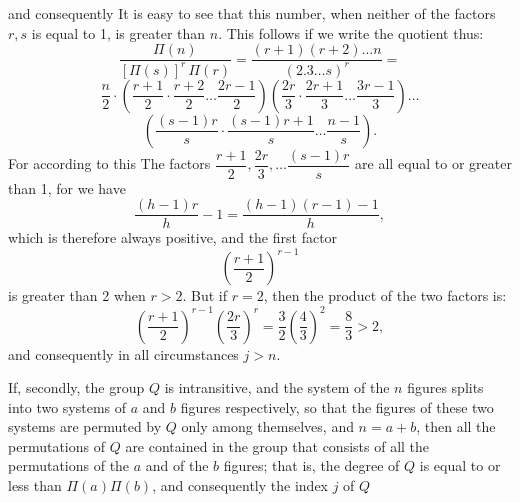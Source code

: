 and consequently
It is easy to see that this number, when neither of the
factors $r, s$ is equal to 1, is greater than $n$. This follows
if we write the quotient thus:
\[
\frac{\Pi(n)}{[\Pi(s)]^r\,\Pi(r)} = \frac{(r+1)(r+2)\dots n}{(2.3\dots s)^r} =
\]
\[
\frac{n}{2}\cdot\left(\frac{r+1}{2}\cdot\frac{r+2}{2}\dots\frac{2r-1}{2}\right)\left(\frac{2r}{3}\cdot\frac{2r+1}{3}\dots\frac{3r-1}{3}\right)\dots
\]
\[
\left(\frac{(s-1)r}{s}\cdot\frac{(s-1)r+1}{s}\dots\frac{n-1}{s}\right).
\]
For according to this
The factors $\dfrac{r+1}{2}, \dfrac{2r}{3}, \dots \dfrac{(s-1)r}{s}$ are all equal to or
greater than 1, for we have
\[
\frac{(h-1)r}{h} - 1 = \frac{(h-1)(r-1)-1}{h},
\]
which is therefore always positive, and the first factor
\[
\left(\frac{r+1}{2}\right)^{r-1}
\]
is greater than 2 when $r > 2$. But if $r = 2$, then the
product of the two factors is:
\[
\left(\frac{r+1}{2}\right)^{r-1}\left(\frac{2r}{3}\right)^r = \frac{3}{2}\left(\frac{4}{3}\right)^2 = \frac{8}{3} > 2,
\]
and consequently in all circumstances $j > n$.

If, secondly, the group $Q$ is intransitive, and the
system of the $n$ figures splits into two systems of $a$ and $b$ figures respectively, so
that the figures of these two systems are permuted by $Q$ only among
 themselves, and $n = a + b$, then all the permutations
 of $Q$ are contained in the group that consists of all the permutations
 of the $a$ and of the $b$ figures; that is, the degree
of $Q$ is equal to or less than $\Pi(a)\Pi(b)$, and consequently the
index $j$ of $Q$
